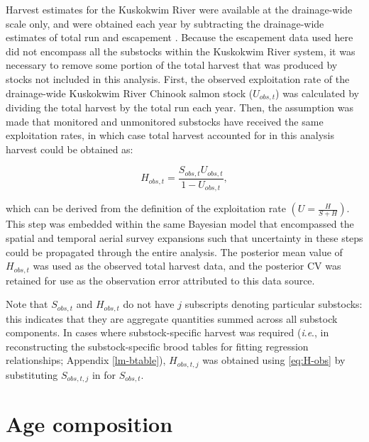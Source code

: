 \documentclass[12pt,]{book}
\theoremstyle{definition}
\theoremstyle{definition}
\theoremstyle{definition}
\theoremstyle{remark}
\begin{document}
\noindent
Harvest estimates for the Kuskokwim River were available at the
drainage-wide scale only, and were obtained each year by subtracting the
drainage-wide estimates of total run and escapement
\citep{liller-etal-2018}. Because the escapement data used here did not
encompass all the substocks within the Kuskokwim River system, it was
necessary to remove some portion of the total harvest that was produced
by stocks not included in this analysis. First, the observed
exploitation rate of the drainage-wide Kuskokwim River Chinook salmon
stock (\(U_{obs,t}\)) was calculated by dividing the total harvest by
the total run each year. Then, the assumption was made that monitored
and unmonitored substocks have received the same exploitation rates, in
which case total harvest accounted for in this analysis harvest could be
obtained as:

\begin{equation}
  H_{obs,t} = \frac{S_{obs,t} U_{obs,t}}{1-U_{obs,t}},
  \label{eq:H-obs}
\end{equation}

\noindent
which can be derived from the definition of the exploitation rate
\(\left(U = \frac{H}{S+H}\right)\). This step was embedded within the
same Bayesian model that encompassed the spatial and temporal aerial
survey expansions such that uncertainty in these steps could be
propagated through the entire analysis. The posterior mean value of
\(H_{obs,t}\) was used as the observed total harvest data, and the
posterior CV was retained for use as the observation error attributed to
this data source.

Note that \(S_{obs,t}\) and \(H_{obs,t}\) do not have \(j\) subscripts
denoting particular substocks: this indicates that they are aggregate
quantities summed across all substock components. In cases where
substock-specific harvest was required (\emph{i}.\emph{e}., in
reconstructing the substock-specific brood tables for fitting regression
relationships; Appendix \ref{lm-btable}), \(H_{obs,t,j}\) was obtained
using \eqref{eq:H-obs} by substituting \(S_{obs,t,j}\) in for
\(S_{obs,t}\).

\section{Age composition}\label{age-comp}
\end{document}
